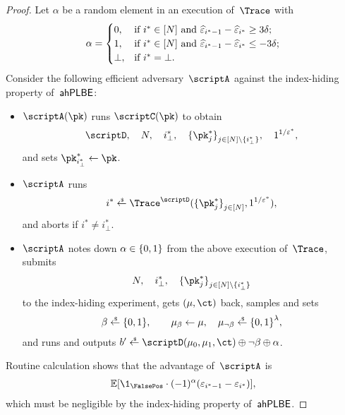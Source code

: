 \begin{proof}
Let $\alpha$ be a random element in an execution of~$\Trace$ with
\begin{align*}
\alpha=\begin{cases}
0,&\textup{if }i^\ast\in[N]\textup{ and }
\widehat{\epsilon}_{i^\ast-1}-\widehat{\epsilon}_{i^\ast}\geq 3\delta;\\
1,&\textup{if }i^\ast\in[N]\textup{ and }
\widehat{\epsilon}_{i^\ast-1}-\widehat{\epsilon}_{i^\ast}\leq -3\delta;\\
\bot,&\textup{if }i^\ast=\bot.
\end{cases}
\end{align*}
Consider the following efficient adversary~$\scriptA$ against the index-hiding property of~$\AHPLBE$:
\begin{itemize}
\item $\scriptA(\pk)$ runs $\scriptC(\pk)$ to obtain
\begin{align*}
\scriptD,\quad
N,\quad
i_\bot^\ast,\quad
\{\pk^\ast_j\}_{j\in{[N]\setminus{\{i_\bot^\ast\}}}}^\sphantom,\quad
1^{1/\epsilon^\ast},
\end{align*}
and sets ${\pk^\ast_{i_\bot^\ast}\gets\pk}$.
\item $\scriptA$ runs
\begin{align*}
i^\ast\draws\Trace^\scriptD(\{\pk^\ast_j\}_{j\in[N]}^\sphantom,1^{1/\epsilon^\ast}),
\end{align*}
and aborts if ${i^\ast\neq i_\bot^\ast}$.
\item $\scriptA$ notes down ${\alpha\in{\{0,1\}}}$ from the above execution of~$\Trace$,
submits
\begin{align*}
N,\quad
i_\bot^\ast,\quad
\{\pk^\ast_j\}_{j\in[N]\setminus\{i_\bot^\ast\}}^\sphantom
\end{align*}
to the index-hiding experiment,
gets $(\mu,\ct)$ back,
samples and sets
\begin{align*}
\beta\draws\bit,\qquad
\mu_\beta\gets\mu,\quad
\mu_{\neg\beta}\draws\bit^\lambda,
\end{align*}
and runs and outputs
${b'\draws\scriptD(\mu_0,\mu_1,\ct)\oplus\neg\beta\oplus\alpha}$.
\end{itemize}
Routine calculation shows that the advantage of~$\scriptA$ is
\begin{align*}
\EX[\1_\FalsePos\cdot(-1)^\alpha(\epsilon_{i^\ast-1}-\epsilon_{i^\ast})],
\end{align*}
which must be negligible by the index-hiding property of~$\AHPLBE$.


\end{proof}
